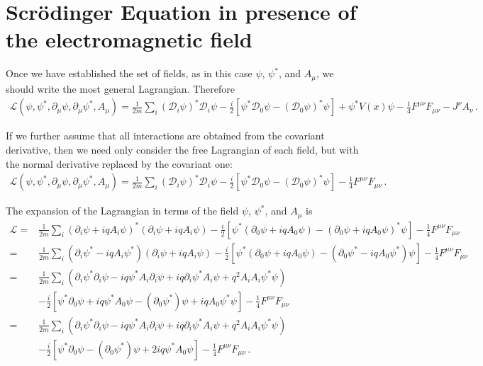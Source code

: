 \section{Scrödinger Equation in presence of the electromagnetic field}



Once we have established the set of fields, as in this case $\psi$, $\psi^*$, and $A_\mu$, we should write the most general Lagrangian. Therefore
\begin{align}
   \mathcal{L}(\psi,\psi^*,\partial_\mu\psi,\partial_\mu\psi^*,A_\mu)
=\frac{1}{2m}\sum_i\left(\mathcal{D}_i\psi\right)^*\mathcal{D}_i\psi-\frac{i}{2}
  \left[\psi^*\mathcal{D}_0\psi-\left(\mathcal{D}_0\psi\right)^*\psi\right]+\psi^*V(x)\psi
-\frac{1}{4}F^{\mu\nu}F_{\mu\nu}-J^\nu A_\nu\,.
\end{align}
 
If we further assume that all interactions are obtained from the covariant derivative, then we need only consider the free Lagrangian of each field, but with the normal derivative replaced by the covariant one:
\begin{align}
   \mathcal{L}(\psi,\psi^*,\partial_\mu\psi,\partial_\mu\psi^*,A_\mu)
=\frac{1}{2m}\sum_i\left(\mathcal{D}_i\psi\right)^*\mathcal{D}_i\psi-\frac{i}{2}
  \left[\psi^*\mathcal{D}_0\psi-\left(\mathcal{D}_0\psi\right)^*\psi\right]
-\frac{1}{4}F^{\mu\nu}F_{\mu\nu}\,.
\end{align}

The expansion of the Lagrangian in terms of the field $\psi$, $\psi^*$, and $A_\mu$ is 
\begin{align}
\label{eq:178qft}
   \mathcal{L}
=&\frac{1}{2m}\sum_i\left(\partial_i\psi+i q A_i\psi\right)^*\left(\partial_i\psi+i q A_i\psi\right)-\frac{i}{2}
  \left[\psi^*\left(\partial_0\psi+i q A_0\psi\right)-\left(\partial_0\psi+i q A_0\psi\right)^*\psi\right] 
-\frac{1}{4}F^{\mu\nu}F_{\mu\nu}\nonumber\\
=&\frac{1}{2m}\sum_i\left(\partial_i\psi^*-i q A_i\psi^*\right)\left(\partial_i\psi+i q A_i\psi\right)-\frac{i}{2}
  \left[\psi^*\left(\partial_0\psi+i q A_0\psi\right)-\left(\partial_0\psi^*-i q A_0\psi^*\right)\psi\right]
  -\frac{1}{4}F^{\mu\nu}F_{\mu\nu}\nonumber\\
 =&\frac{1}{2m}\sum_i\left(\partial_i\psi^*\partial_i\psi-i q \psi^*A_i\partial_i\psi+i q \partial_i\psi^*A_i\psi+q^2A_i A_i \psi^*\psi\right)\nonumber\\
 &-\frac{i}{2}
  \left[\psi^*\partial_0\psi+i q \psi^*A_0\psi-(\partial_0\psi^*)\psi+i q A_0\psi^*\psi\right]-\frac{1}{4}F^{\mu\nu}F_{\mu\nu}\nonumber\\
 =&\frac{1}{2m}\sum_i\left(\partial_i\psi^*\partial_i\psi-i q \psi^*A_i\partial_i\psi+i q \partial_i\psi^*A_i\psi+q^2A_i A_i \psi^*\psi\right)\nonumber\\
 &-\frac{i}{2}
  \left[\psi^*\partial_0\psi-(\partial_0\psi^*)\psi+2 i q \psi^*A_0\psi\right]-\frac{1}{4}F^{\mu\nu}F_{\mu\nu}\,.
 \end{align}

